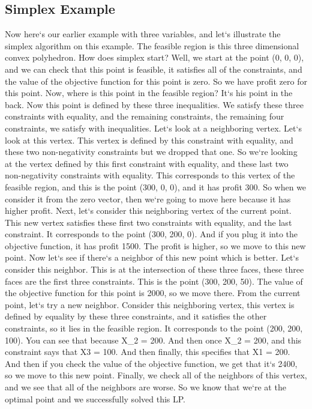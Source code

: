 \subsection{Simplex Example}
Now here`s our earlier example with three variables, and let`s illustrate the simplex algorithm on this example.
The feasible region is this three dimensional convex polyhedron.
How does simplex start? Well, we start at the point (0, 0, 0), and we can check that this point is feasible, it satisfies all of the constraints, and the value of the objective function for this point is zero.
So we have profit zero for this point.
Now, where is this point in the feasible region? It`s his point in the back.
Now this point is defined by these three inequalities.
We satisfy these three constraints with equality, and the remaining constraints, the remaining four constraints, we satisfy with inequalities.
Let`s look at a neighboring vertex.
Let`s look at this vertex.
This vertex is defined by this constraint with equality, and these two non-negativity constraints but we dropped that one.
So we`re looking at the vertex defined by this first constraint with equality, and these last two non-negativity constraints with equality.
This corresponds to this vertex of the feasible region, and this is the point (300, 0, 0), and it has profit 300.
So when we consider it from the zero vector, then we`re going to move here because it has higher profit.
Next, let`s consider this neighboring vertex of the current point.
This new vertex satisfies these first two constraints with equality, and the last constraint.
It corresponds to the point (300, 200, 0).
And if you plug it into the objective function, it has profit 1500.
The profit is higher, so we move to this new point.
Now let`s see if there`s a neighbor of this new point which is better.
Let`s consider this neighbor.
This is at the intersection of these three faces, these three faces are the first three constraints.
This is the point (300, 200, 50).
The value of the objective function for this point is 2000, so we move there.
From the current point, let`s try a new neighbor.
Consider this neighboring vertex, this vertex is defined by equality by these three constraints, and it satisfies the other constraints, so it lies in the feasible region.
It corresponds to the point (200, 200, 100).
You can see that because X\_2 = 200.
And then once X\_2 = 200, and this constraint says that X3 = 100.
And then finally, this specifies that X1 = 200.
And then if you check the value of the objective function, we get that it`s 2400, so we move to this new point.
Finally, we check all of the neighbors of this vertex, and we see that all of the neighbors are worse.
So we know that we`re at the optimal point and we successfully solved this LP\@.

